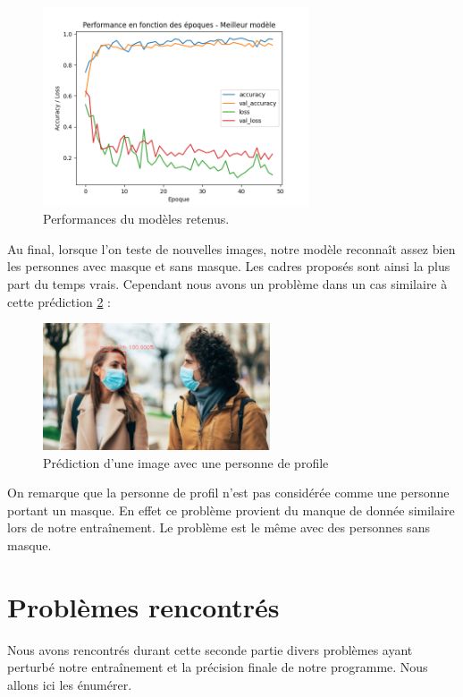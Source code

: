 \documentclass{rapport}
\begin{document}
        \begin{figure}[H]
            \centering
            \includegraphics[width=0.7\textwidth]{rapport/plots/best.png}
            \caption{Performances du modèles retenus.}
            \label{fig:mesh1}
        \end{figure}
     
     \clearpage   
    Au final, lorsque l'on teste de nouvelles images, notre modèle reconnaît assez bien les personnes avec masque et sans masque. Les cadres proposés sont ainsi la plus part du temps vrais. Cependant nous avons un problème dans un cas similaire à cette prédiction \ref{fig:profile} :
    
    \begin{figure}[h]
        \centering
        \includegraphics[width=0.6\textwidth]{rapport/img/demiface.png}
        \caption{Prédiction d'une image avec une personne de profile}
        \label{fig:profile}
    \end{figure}
    
    On remarque que la personne de profil n'est pas considérée comme une personne portant un masque. En effet ce problème provient du manque de donnée similaire lors de notre entraînement. Le problème est le même avec des personnes sans masque.
    
    \section{Problèmes rencontrés}
    Nous avons rencontrés durant cette seconde partie divers problèmes ayant perturbé notre entraînement et la précision finale de notre programme. Nous allons ici les énumérer.
\end{document}

